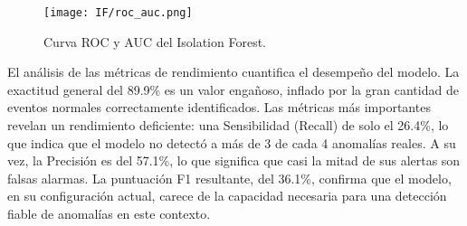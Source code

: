 \begin{figure}[ht!]
      \centering
      \texttt{[image: IF/roc\_auc.png]}
      \caption{Curva ROC y AUC del Isolation Forest.}
      \label{fig:roc_if}
\end{figure}

El análisis de las métricas de rendimiento cuantifica el desempeño del modelo. La exactitud general del 89.9\% es un valor engañoso, inflado por la gran cantidad de eventos normales correctamente identificados. Las métricas más importantes revelan un rendimiento deficiente: una Sensibilidad (Recall) de solo el 26.4\%, lo que indica que el modelo no detectó a más de 3 de cada 4 anomalías reales. A su vez, la Precisión es del 57.1\%, lo que significa que casi la mitad de sus alertas son falsas alarmas. La puntuación F1 resultante, del 36.1\%, confirma que el modelo, en su configuración actual, carece de la capacidad necesaria para una detección fiable de anomalías en este contexto.


